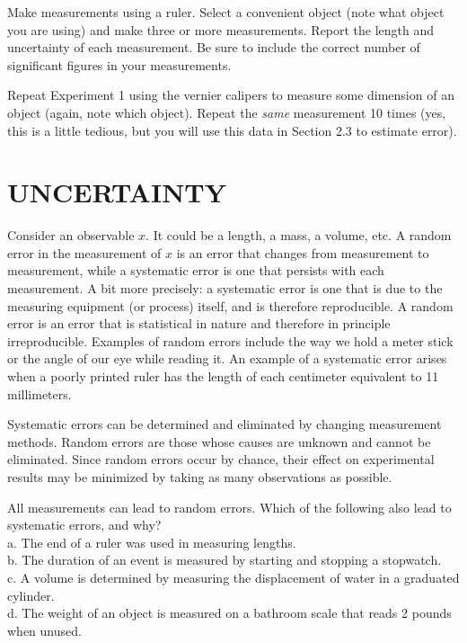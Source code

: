 \documentclass[11pt,letterpaper]{article}
\newcounter{question}[section]
\begin{document}
\clearpage
\question{} Make measurements using a ruler. Select a convenient object (note what object you are using) and make three or more measurements. Report the length and uncertainty of each measurement. Be sure to include the correct number of significant figures in your measurements.
\vspace{6cm}


\question{} Repeat Experiment 1 using the vernier calipers to measure some dimension of an object (again, note which object). Repeat the \textit{same} measurement 10 times (yes, this is a little tedious, but you will use this data in Section 2.3 to estimate error).



\section{UNCERTAINTY}
Consider an observable $x$. It could be a length, a mass, a volume, etc. A random error in the measurement of $x$
is an error that changes from measurement to measurement, while a
systematic error is one that persists with each measurement.  A bit
more precisely:  a systematic error is one that is due to the
measuring equipment (or process) itself, and is therefore
reproducible.  A random error is an error that is
statistical in nature and therefore in principle irreproducible.
Examples of random errors include the way we hold a meter stick or the
angle of our eye while reading it.  An example of a systematic error
arises when a poorly printed ruler has the length of each centimeter
equivalent to 11 millimeters.

Systematic errors can be determined and eliminated by changing measurement methods.  Random errors are those whose causes are unknown and cannot be eliminated.  Since random errors occur by chance, their effect on experimental results may be minimized by taking as many observations as possible.

\question{} All measurements can lead to random errors. Which of the following also lead to systematic errors, and why?\\
a. The end of a ruler was used in measuring lengths.\\
b. The duration of an event is measured by starting and stopping a stopwatch.\\
c. A volume is determined by measuring the displacement of water in a
graduated cylinder.\\
d. The weight of an object is measured on a bathroom scale that reads 2 pounds when unused.\\
\vspace{6cm}
\end{document}

